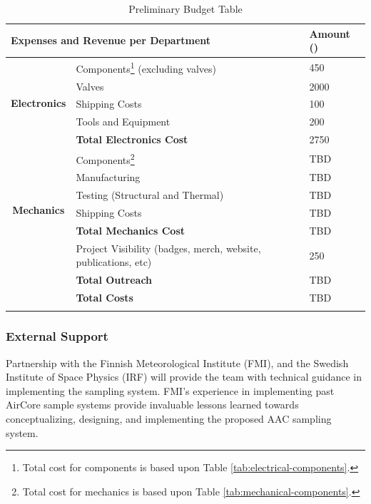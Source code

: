 \documentclass[a4paper,12pt,twoside]{article}
\begin{document}
\pagebreak
\begin{longtable}[]
{|c|l|l|}
\hline
\multicolumn{2}{|l|}{\textbf{Expenses and Revenue per Department}} & Amount (\EUR{}) \\ \hline
\multicolumn{1}{|c|}{\multirow{5}{*}{\textbf{Electronics}}} & Components\footnote{Total cost for components is based upon Table \ref{tab:electrical-components}.} (excluding valves) & 450 \\
\multicolumn{1}{|c|}{} & Valves & 2000 \\
\multicolumn{1}{|c|}{} & Shipping Costs & 100 \\
\multicolumn{1}{|c|}{} & Tools and Equipment & 200 \\ \cline{2-3} 
\multicolumn{1}{|c|}{} & \textbf{Total Electronics Cost} & 2750 \\ \hline
\multicolumn{1}{|c|}{\multirow{6}{*}{\textbf{Mechanics}}} & Components\footnote{Total cost for mechanics is based upon Table \ref{tab:mechanical-components}.} & TBD \\
\multicolumn{1}{|c|}{} & Manufacturing & TBD \\
\multicolumn{1}{|c|}{} & Testing (Structural and Thermal) & TBD \\
\multicolumn{1}{|c|}{} & Shipping Costs & TBD \\
\cline{2-3} 
\multicolumn{1}{|c|}{} & \textbf{Total Mechanics Cost} & TBD \\ \hline
\multicolumn{1}{|c|}{} & Project Visibility (badges, merch, website, publications, etc) & 250\\
\cline{2-3} 
\multicolumn{1}{|c|}{} & \textbf{Total Outreach} & TBD \\ \hline
\multicolumn{1}{l|}{} & \textbf{Total Costs} & TBD \\ \cline{2-3} 
\caption{Preliminary Budget Table}
\label{tab:budget-table}
\end{longtable}
\raggedbottom


\subsubsection{External Support}

Partnership with the Finnish Meteorological Institute (FMI), and the Swedish Institute of Space Physics (IRF) will provide the team with technical guidance in implementing the sampling system. FMI’s experience in implementing past AirCore sample systems provide invaluable lessons learned towards conceptualizing, designing, and implementing the proposed AAC sampling system.
\end{document}
